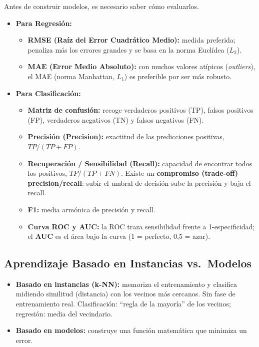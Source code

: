\documentclass[12pt]{book} %
\providecommand{\tightlist}{%
  \setlength{\itemsep}{0pt}\setlength{\parskip}{0pt}}
\begin{document}
Antes de construir modelos, es necesario saber cómo evaluarlos.

\begin{itemize}
\tightlist
\item
  \textbf{Para Regresión:}

  \begin{itemize}
  \tightlist
  \item
    \textbf{RMSE (Raíz del Error Cuadrático Medio):} medida preferida;
    penaliza más los errores grandes y se basa en la norma Euclídea
    (\(L_2\)).
  \item
    \textbf{MAE (Error Medio Absoluto):} con muchos valores atípicos
    (\emph{outliers}), el MAE (norma Manhattan, \(L_1\)) es preferible
    por ser más robusto.
  \end{itemize}
\item
  \textbf{Para Clasificación:}

  \begin{itemize}
  \tightlist
  \item
    \textbf{Matriz de confusión:} recoge verdaderos positivos (TP),
    falsos positivos (FP), verdaderos negativos (TN) y falsos negativos
    (FN).
  \item
    \textbf{Precisión (Precision):} exactitud de las predicciones
    positivas, \(TP / (TP+FP)\).
  \item
    \textbf{Recuperación / Sensibilidad (Recall):} capacidad de
    encontrar todos los positivos, \(TP / (TP+FN)\). Existe un
    \textbf{compromiso (trade-off) precision/recall}: subir el umbral de
    decisión sube la precisión y baja el recall.
  \item
    \textbf{F1:} media armónica de precisión y recall.
  \item
    \textbf{Curva ROC y AUC:} la ROC traza sensibilidad frente a
    1-especificidad; el \textbf{AUC} es el área bajo la curva (1 =
    perfecto, 0,5 = azar).
  \end{itemize}
\end{itemize}

\hypertarget{aprendizaje-basado-en-instancias-vs.-modelos}{%
\subsection{Aprendizaje Basado en Instancias
vs.~Modelos}\label{aprendizaje-basado-en-instancias-vs.-modelos}}

\begin{itemize}
\tightlist
\item
  \textbf{Basado en instancias (k-NN):} memoriza el entrenamiento y
  clasifica midiendo similitud (distancia) con los vecinos más cercanos.
  Sin fase de entrenamiento real. Clasificación: ``regla de la mayoría''
  de los vecinos; regresión: media del vecindario.
\item
  \textbf{Basado en modelos:} construye una función matemática que
  minimiza un error.
\end{itemize}
\end{document}
